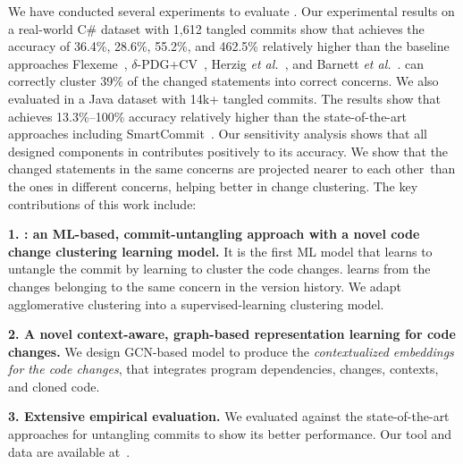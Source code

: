 We have conducted several experiments to evaluate
    {\tool}. Our experimental results on a real-world C\# dataset with
    1,612 tangled commits show that {\tool} achieves the
    accuracy of 36.4\%, 28.6\%, 55.2\%, and 462.5\% relatively higher
    than the baseline approaches Flexeme~\cite{flexeme-fse20},
    $\delta$-PDG+CV~\cite{flexeme-fse20}, Herzig {\em et
      al.}~\cite{kim-emse16}, and Barnett {\em et
      al.}~\cite{barnett-icse15}. {\tool} can correctly cluster 39\%
    of the changed statements into correct concerns.
%
We also evaluated {\tool} in a Java dataset with 14k+ tangled
commits. The results show that {\tool} achieves 13.3\%--100\% accuracy
relatively higher than the state-of-the-art approaches
including SmartCommit~\cite{smartcommit-fse21}. Our sensitivity analysis
shows that all designed components in {\tool} contributes positively
to its accuracy. We show that the changed statements in the same
concerns are projected nearer to each other~than the ones in different
concerns, helping {\tool} better in change
clustering.  The key contributions of this work include:

{\bf 1. {\tool}: an ML-based, commit-untangling approach with a novel
  code change clustering learning model.} It is the first ML model
that learns to untangle the commit by learning to cluster the code
changes.  {\tool} learns from the changes belonging to the same
concern in the version history. We adapt agglomerative clustering
into a supervised-learning clustering model.

{\bf 2. A novel context-aware, graph-based representation learning for
  code changes.} We design GCN-based model to produce the {\em
  contextualized embeddings for the code changes}, that
integrates program dependencies, changes, contexts, and cloned code.

{\bf 3. Extensive empirical evaluation.} We evaluated {\tool} against
the state-of-the-art approaches for untangling commits to show its better
performance. Our tool and data are available at~\cite{utango-website}.

